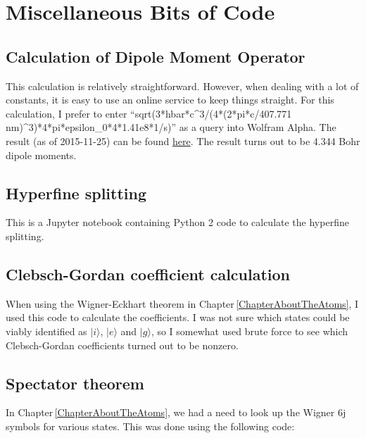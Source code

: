 \chapter{Miscellaneous Bits of Code}
\label{sympy6jAppendix}

\section{Calculation of Dipole Moment Operator}
This calculation is relatively straightforward. However, when dealing with a lot of constants, it is easy to use an online service to keep things straight. For this calculation, I prefer to enter ``sqrt(3*hbar*c\^{}3/(4*(2*pi*c/407.771 nm)\^{}3)*4*pi*epsilon\_0*4*1.41e8*1/s)'' as a query into Wolfram Alpha. The result (as of 2015-11-25) can be found 
\href{http://www.wolframalpha.com/input/?i=sqrt%283*hbar*c%5E3%2F%284*%282*pi*c%2F407.771+nm%29%5E3%29*4*pi*epsilon_0*4*1.41e8*1%2Fs%29}{here}.
The result turns out to be 4.344 Bohr dipole moments.
\section{Hyperfine splitting}
This is a Jupyter notebook containing Python 2 code to calculate the hyperfine splitting.

\section{Clebsch-Gordan coefficient calculation}
When using the Wigner-Eckhart theorem in Chapter\,\ref{ChapterAboutTheAtoms}, I used this code to calculate the coefficients. I was not sure which states could be viably identified as $|i\rangle$, $|e\rangle$ and $|g\rangle$, so I somewhat used brute force to see which Clebsch-Gordan coefficients turned out to be nonzero. 

\section{Spectator theorem}
In Chapter\,\ref{ChapterAboutTheAtoms}, we had a need to look up the Wigner 6j symbols for various states. This was done using the following code:

